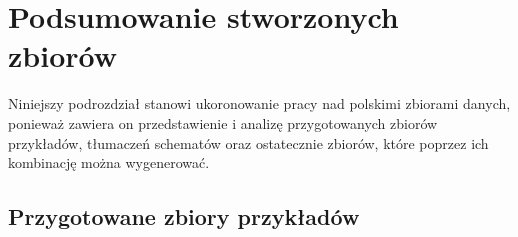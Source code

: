 \section{Podsumowanie stworzonych zbiorów}
Niniejszy podrozdział stanowi ukoronowanie pracy nad polskimi zbiorami danych, ponieważ zawiera on przedstawienie i analizę przygotowanych zbiorów przykładów, tłumaczeń schematów oraz ostatecznie zbiorów, które poprzez ich kombinację można wygenerować.

\subsection{Przygotowane zbiory przykładów}


